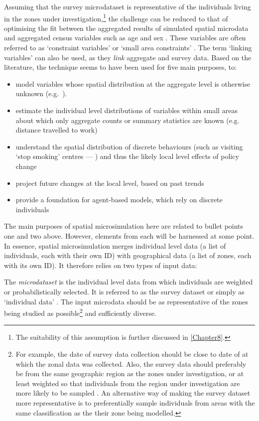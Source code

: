 \documentclass[a4paper, 11pt, twoside]{Thesis}
\begin{document}
Assuming that the survey microdataset is representative of the
individuals living in the zones under investigation,\footnote{The suitability
of this assumption is further discussed in \cref{Chapter8}.} the
challenge can be reduced to that of optimising the fit between
the aggregated results of simulated
spatial microdata and aggregated census variables such as age
and sex \citep{Williamson1998}. These variables are often
referred to as `constraint variables' or `small area constraints'
\citep{Hermes2012a}. The term `linking variables' can also be used, as they
\emph{link} aggregate and survey data.
Based on the literature, the technique seems to have been used for five main
purposes, to:
\begin{itemize}
 \item model variables whose spatial distribution at the aggregate level is
otherwise unknown (e.g.~\citealp{Ballas1999}).
\item estimate the individual level distributions of variables within small
areas about which only aggregate counts or summary statistics are known (e.g.
distance travelled to work)
\item understand the spatial distribution of discrete behaviours
(such as visiting `stop smoking' centres --- \citealp{Tomintz2008})
and thus the likely local level effects of policy change \citep{Ballas2001}
\item project future changes at the local level, based on past trends
\citep{Ballas2005}
\item provide a foundation for agent-based models, which rely on
discrete individuals \citep{Ballas2007simb, Pritchard2012, Wu2010}
\end{itemize}
The main purposes of spatial microsimulation here are
related to bullet points one
and two above. However, elements from each will be harnessed at some
point.
In essence, spatial microsimulation merges individual level data (a list
of individuals, each with their own ID) with geographical data (a list of
zones, each with its own ID). It therefore relies on two types of input data:

The \emph{microdataset} is the individual level data from which individuals are
weighted or probabilistically selected. It is referred to as the survey
dataset \citep{Wu2008} or simply as `individual data' \citep{Simpson2005}.
The input microdata should be as representative of the zones being studied as
possible\footnote{For
example, the date of survey data collection should be
close to date of at which the zonal data was collected. Also, the survey data
should preferably be from the same geographic region as the zones under
investigation, or at least weighted so that individuals from the region under
investigation are more likely to be sampled \citep{Ballas2005-ireland}. An alternative
way of making the survey dataset more representative is to preferentially
sample individuals from areas with the same classification as the 
their zone being modelled.
}
and sufficiently diverse. 
\end{document}
